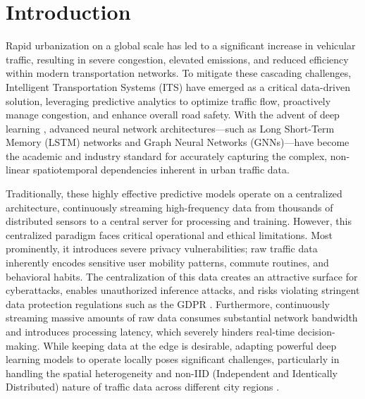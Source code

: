 \documentclass[pdflatex,sn-mathphys-num]{sn-jnl}
\theoremstyle{thmstyleone}
\theoremstyle{thmstyletwo}
\theoremstyle{thmstylethree}
\begin{document}
\section{Introduction}

Rapid urbanization on a global scale has led to a significant increase in vehicular traffic, resulting in severe congestion, elevated emissions, and reduced efficiency within modern transportation networks. To mitigate these cascading challenges, Intelligent Transportation Systems (ITS) have emerged as a critical data-driven solution, leveraging predictive analytics to optimize traffic flow, proactively manage congestion, and enhance overall road safety. With the advent of deep learning \cite{lecun2015deep,goodfellow2016deep}, advanced neural network architectures---such as Long Short-Term Memory (LSTM) networks \cite{hochreiter1997lstm} and Graph Neural Networks (GNNs)---have become the academic and industry standard for accurately capturing the complex, non-linear spatiotemporal dependencies inherent in urban traffic data.

Traditionally, these highly effective predictive models operate on a centralized architecture, continuously streaming high-frequency data from thousands of distributed sensors to a central server for processing and training. However, this centralized paradigm faces critical operational and ethical limitations. Most prominently, it introduces severe privacy vulnerabilities; raw traffic data inherently encodes sensitive user mobility patterns, commute routines, and behavioral habits. The centralization of this data creates an attractive surface for cyberattacks, enables unauthorized inference attacks, and risks violating stringent data protection regulations such as the GDPR \cite{gdpr2016}. Furthermore, continuously streaming massive amounts of raw data consumes substantial network bandwidth and introduces processing latency, which severely hinders real-time decision-making. While keeping data at the edge is desirable, adapting powerful deep learning models to operate locally poses significant challenges, particularly in handling the spatial heterogeneity and non-IID (Independent and Identically Distributed) nature of traffic data across different city regions \cite{Zhao2018FederatedNonIID}.
\end{document}
